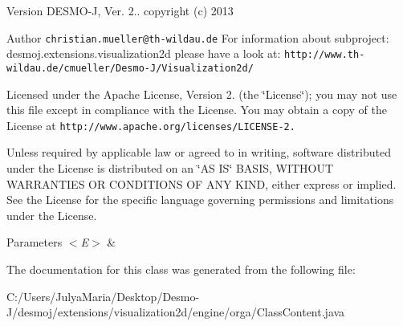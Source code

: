 \begin{DoxyVersion}{Version}
D\-E\-S\-M\-O-\/\-J, Ver. 2.. copyright (c) 2013 
\end{DoxyVersion}
\begin{DoxyAuthor}{Author}
{\tt christian.\-mueller@th-\/wildau.\-de} For information about subproject\-: desmoj.\-extensions.\-visualization2d please have a look at\-: {\tt http\-://www.\-th-\/wildau.\-de/cmueller/\-Desmo-\/\-J/\-Visualization2d/}
\end{DoxyAuthor}
Licensed under the Apache License, Version 2. (the \char`\"{}\-License\char`\"{}); you may not use this file except in compliance with the License. You may obtain a copy of the License at {\tt http\-://www.\-apache.\-org/licenses/\-L\-I\-C\-E\-N\-S\-E-\/2.}

Unless required by applicable law or agreed to in writing, software distributed under the License is distributed on an \char`\"{}\-A\-S I\-S\char`\"{} B\-A\-S\-I\-S, W\-I\-T\-H\-O\-U\-T W\-A\-R\-R\-A\-N\-T\-I\-E\-S O\-R C\-O\-N\-D\-I\-T\-I\-O\-N\-S O\-F A\-N\-Y K\-I\-N\-D, either express or implied. See the License for the specific language governing permissions and limitations under the License.


\begin{DoxyParams}{Parameters}
{\em $<$\-E$>$} & \\
\hline
\end{DoxyParams}


The documentation for this class was generated from the following file\-:\begin{DoxyCompactItemize}
\item 
C\-:/\-Users/\-Julya\-Maria/\-Desktop/\-Desmo-\/\-J/desmoj/extensions/visualization2d/engine/orga/Class\-Content.\-java\end{DoxyCompactItemize}
